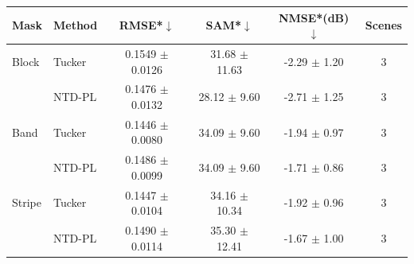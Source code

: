\begin{tabular}{@{}l l c c c c@{}}
\toprule
Mask & Method & RMSE*$\downarrow$ & SAM*$\downarrow$ & NMSE*(dB)$\downarrow$ & Scenes\\
\midrule
Block & Tucker & 0.1549 $\pm$ 0.0126 & 31.68 $\pm$ 11.63 & -2.29 $\pm$ 1.20 & 3\\
 & NTD-PL & 0.1476 $\pm$ 0.0132 & 28.12 $\pm$ 9.60 & -2.71 $\pm$ 1.25 & 3\\
\midrule
Band & Tucker & 0.1446 $\pm$ 0.0080 & 34.09 $\pm$ 9.60 & -1.94 $\pm$ 0.97 & 3\\
 & NTD-PL & 0.1486 $\pm$ 0.0099 & 34.09 $\pm$ 9.60 & -1.71 $\pm$ 0.86 & 3\\
\midrule
Stripe & Tucker & 0.1447 $\pm$ 0.0104 & 34.16 $\pm$ 10.34 & -1.92 $\pm$ 0.96 & 3\\
 & NTD-PL & 0.1490 $\pm$ 0.0114 & 35.30 $\pm$ 12.41 & -1.67 $\pm$ 1.00 & 3\\
\bottomrule
\end{tabular}

